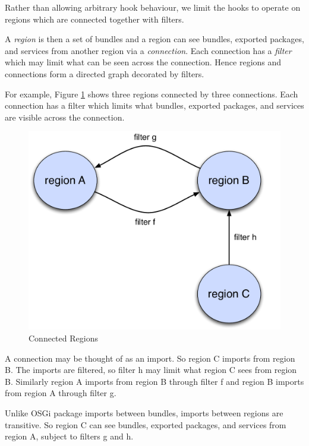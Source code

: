 \documentclass[a4paper,9pt]{article}
\begin{document}
Rather than allowing arbitrary hook behaviour, we limit the hooks to operate on regions
which are connected together with filters.

A \textit{region} is then a set of bundles and a region can see bundles, exported packages, and services
from another region via a \textit{connection}. Each connection has a \textit{filter} which may limit
what can be seen across the connection.
Hence regions and connections form a directed graph decorated by filters.

For example, Figure \ref{fig:conn} shows three regions connected by three connections.
Each connection has a filter which limits what bundles, exported packages, and services
are visible across the connection.

\begin{figure}[h!]
\begin{center}
\includegraphics*[scale=0.35]{connected-regions.pdf}
\caption{Connected Regions}
\end{center}
\label{fig:conn}
\end{figure}

A connection may be thought of as an import. So region C imports from region B.
The imports are filtered, so filter h may limit what region C sees from region B.
Similarly region A imports from region B through filter f and region B imports from region A through
filter g.

Unlike OSGi package imports between bundles, imports between regions are transitive.
So region C can see bundles, exported packages, and services from region A, subject to filters g and h.
\end{document}
